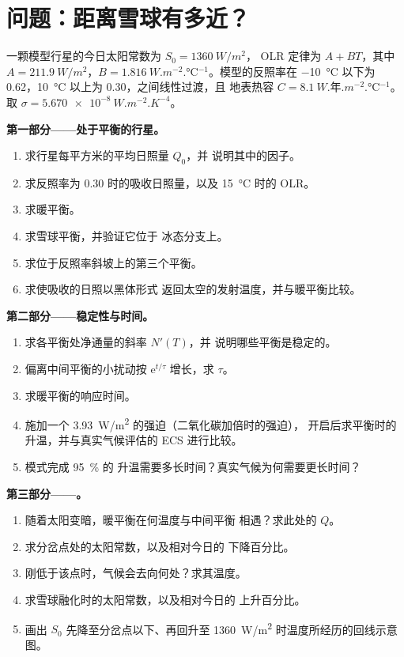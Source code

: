 \section{问题：距离雪球有多近？}

\begin{problem}
\label{pb:b3:climate-models:1}
一颗模型行星的今日太阳常数为 $S_0 = \qty{1360}{W/m^2}$，
OLR 定律为 $A + BT$，其中 $A = \qty{211.9}{W/m^2}$，$B =
\qty{1.816}{W.m^{-2}.\celsius^{-1}}$。模型的反照率在
\qty{-10}{\celsius} 以下为 0.62，\qty{+10}{\celsius} 以上为 0.30，之间线性过渡，且
地表热容 $C = \qty{8.1}{W.\text{年}.m^{-2}.\celsius^{-1}}$。取
$\sigma = \qty{5.670e-8}{W.m^{-2}.K^{-4}}$。

\medskip\noindent\textbf{第一部分——处于平衡的行星。}
\begin{enumerate}
\item 求行星每平方米的平均日照量 $Q_0$，并
  说明其中的因子。
\item 求反照率为 0.30 时的吸收日照量，以及
  \qty{15}{\celsius} 时的 OLR。
\item 求暖平衡。
\item 求雪球平衡，并验证它位于
  冰态分支上。
\item 求位于反照率斜坡上的第三个平衡。
\item 求使吸收的日照以黑体形式
  返回太空的发射温度，并与暖平衡比较。
\end{enumerate}

\medskip\noindent\textbf{第二部分——稳定性与时间。}
\begin{enumerate}[resume]
\item 求各平衡处净通量的斜率 $N'(T)$，并
  说明哪些平衡是稳定的。
\item 偏离中间平衡的小扰动按 $\mathrm
  e^{t/\tau}$ 增长，求 $\tau$。
\item 求暖平衡的响应时间。
\item 施加一个 \qty{3.93}{W/m^2} 的强迫（二氧化碳加倍时的强迫），
  开启后求平衡时的升温，并与真实气候评估的
  ECS 进行比较。
\item 模式完成 \qty{95}{\percent} 的
  升温需要多长时间？真实气候为何需要更长时间？
\end{enumerate}

\medskip\noindent\textbf{第三部分——。}
\begin{enumerate}[resume]
\item 随着太阳变暗，暖平衡在何温度与中间平衡
  相遇？求此处的 $Q$。
\item 求分岔点处的太阳常数，以及相对今日的
  下降百分比。
\item 刚低于该点时，气候会去向何处？求其温度。
\item 求雪球融化时的太阳常数，以及相对今日的
  上升百分比。
\item 画出 $S_0$ 先降至分岔点以下、再回升至
  \qty{1360}{W/m^2} 时温度所经历的回线示意图。
\end{enumerate}


\end{problem}
